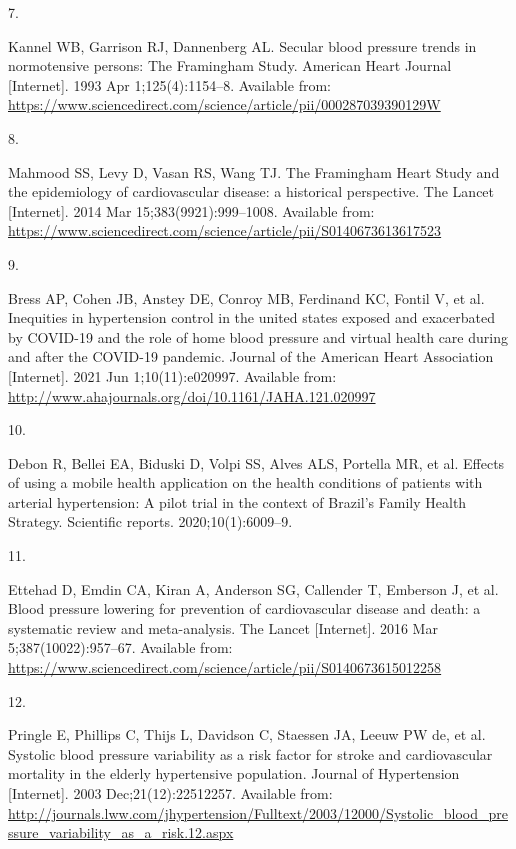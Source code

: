 \documentclass[
]{article}
\newlength{\cslhangindent}
\newlength{\csllabelwidth}
\newlength{\cslentryspacingunit} %
\newenvironment{CSLReferences}[2] %
 {%
  \setlength{\parindent}{0pt}
  \ifodd #1
  \let\oldpar\par
  \def\par{\hangindent=\cslhangindent\oldpar}
  \fi
  \setlength{\parskip}{#2\cslentryspacingunit}
 }%
 {}
\newcommand{\CSLLeftMargin}[1]{\parbox[t]{\csllabelwidth}{#1}}
\newcommand{\CSLRightInline}[1]{\parbox[t]{\linewidth - \csllabelwidth}{#1}\break}
\begin{document}
\begin{CSLReferences}{0}{0}
\leavevmode{}%
\CSLLeftMargin{7. }%
\CSLRightInline{Kannel WB, Garrison RJ, Dannenberg AL. Secular blood
pressure trends in normotensive persons: The Framingham Study. American
Heart Journal {[}Internet{]}. 1993 Apr 1;125(4):1154--8. Available from:
\url{https://www.sciencedirect.com/science/article/pii/000287039390129W}}

\leavevmode{}%
\CSLLeftMargin{8. }%
\CSLRightInline{Mahmood SS, Levy D, Vasan RS, Wang TJ. The Framingham
Heart Study and the epidemiology of cardiovascular disease: a historical
perspective. The Lancet {[}Internet{]}. 2014 Mar 15;383(9921):999--1008.
Available from:
\url{https://www.sciencedirect.com/science/article/pii/S0140673613617523}}

\leavevmode{}%
\CSLLeftMargin{9. }%
\CSLRightInline{Bress AP, Cohen JB, Anstey DE, Conroy MB, Ferdinand KC,
Fontil V, et al. Inequities in hypertension control in the united states
exposed and exacerbated by COVID{-}19 and the role of home blood
pressure and virtual health care during and after the COVID{-}19
pandemic. Journal of the American Heart Association {[}Internet{]}. 2021
Jun 1;10(11):e020997. Available from:
\url{http://www.ahajournals.org/doi/10.1161/JAHA.121.020997}}

\leavevmode{}%
\CSLLeftMargin{10. }%
\CSLRightInline{Debon R, Bellei EA, Biduski D, Volpi SS, Alves ALS,
Portella MR, et al. Effects of using a mobile health application on the
health conditions of patients with arterial hypertension: A pilot trial
in the context of Brazil's Family Health Strategy. Scientific reports.
2020;10(1):6009--9. }

\leavevmode{}%
\CSLLeftMargin{11. }%
\CSLRightInline{Ettehad D, Emdin CA, Kiran A, Anderson SG, Callender T,
Emberson J, et al. Blood pressure lowering for prevention of
cardiovascular disease and death: a systematic review and meta-analysis.
The Lancet {[}Internet{]}. 2016 Mar 5;387(10022):957--67. Available
from:
\url{https://www.sciencedirect.com/science/article/pii/S0140673615012258}}

\leavevmode{}%
\CSLLeftMargin{12. }%
\CSLRightInline{Pringle E, Phillips C, Thijs L, Davidson C, Staessen JA,
Leeuw PW de, et al. Systolic blood pressure variability as a risk factor
for stroke and cardiovascular mortality in the elderly hypertensive
population. Journal of Hypertension {[}Internet{]}. 2003
Dec;21(12):22512257. Available from:
\url{http://journals.lww.com/jhypertension/Fulltext/2003/12000/Systolic_blood_pressure_variability_as_a_risk.12.aspx}}


\end{CSLReferences}
\end{document}
